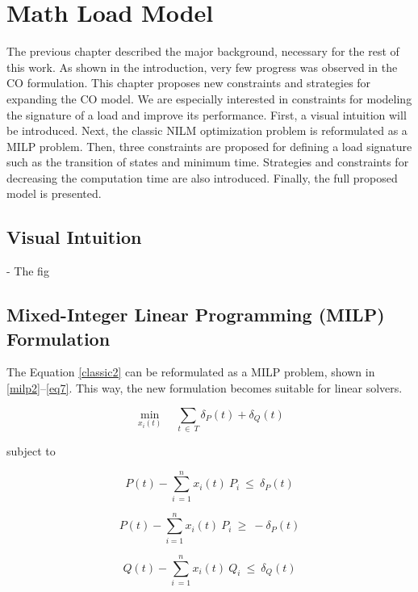 
\chapter{Math Load Model}

The previous chapter described the major background, necessary for the rest of this work. As shown in the introduction, very few progress was observed in the CO formulation. This chapter proposes new constraints and strategies for expanding the CO model. We are especially interested in constraints for modeling the signature of a load and improve its performance. First, a visual intuition will be introduced. Next, the classic NILM optimization problem is reformulated as a MILP problem. Then, three constraints are proposed for defining a load signature such as the transition of states and minimum time. Strategies and constraints for decreasing the computation time are also introduced. Finally, the full proposed model is presented. 

\section{Visual Intuition}
- The fig

\section{Mixed-Integer Linear Programming (MILP) Formulation}

The Equation \eqref{classic2} can be reformulated as a MILP problem, shown in \eqref{milp2}--\eqref{eq7}. This way, the new formulation becomes suitable for linear solvers.

\begin{equation} \label{milp2}
    \min_{x_i(t)} \quad \sum_{t\ \in\ T} \delta_P(t) + \delta_Q(t)
\end{equation}

subject to 

\begin{equation} \label{eq65}
    P(t) - \sum_{i\ = 1}^{n} x_i(t)\ P_i \ \leq \ \delta_P(t) 
\end{equation}

\begin{equation} 
  P(t) - \sum_{i = 1}^{n} x_i(t)\ P_i \ \geq \ -\delta_P(t)
\end{equation}

\begin{equation} 
   Q(t) - \sum_{i\ = 1}^{n} x_i(t)\ Q_i \ \leq \ \delta_Q(t)
\end{equation}

